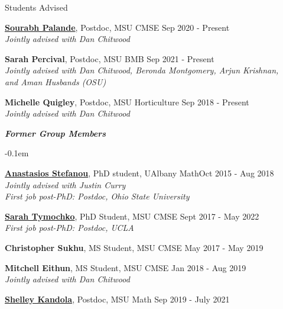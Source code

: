 \documentclass{resume} %
\begin{document}
\begin{rSection}{Students Advised}
\begin{list}{}{\leftmargin=1em}
   \item \textbf{\href{http://sci.utah.edu/~sourabh/}{Sourabh Palande}}, Postdoc, MSU CMSE \hfill Sep 2020 - Present\\
   \phantom{XXX} \textit{Jointly advised with Dan Chitwood}

   \item \textbf{Sarah Percival}, Postdoc, MSU BMB \hfill Sep 2021 - Present\\
   \phantom{XXX} \textit{Jointly advised with Dan Chitwood, Beronda Montgomery, Arjun Krishnan,}\\
   \phantom{XXX} \textit{and Aman Husbands (OSU)}

   \item \textbf{Michelle Quigley}, Postdoc, MSU Horticulture \hfill Sep 2018 - Present\\
   \phantom{XXX} \textit{Jointly advised with Dan Chitwood}

\end{list}

\textbf{\textit{Former Group Members}}
\begin{list}{}{\leftmargin=1em}
   \itemsep -0.1em %


   \item \textbf{\href{https://sites.google.com/view/anastasiostefanou/home}{Anastasios Stefanou}}, PhD student, UAlbany Math\hfill Oct 2015 - Aug 2018
\\
   \phantom{XXX} \textit{Jointly advised with Justin Curry}
\\
   \phantom{XXX} \textit{First job post-PhD: Postdoc, Ohio State University}


   \item \textbf{\href{https://www.sarahtymochko.com/}{Sarah Tymochko}}, PhD Student, MSU CMSE \hfill Sept 2017 - May 2022
\\
   \phantom{XXX} \textit{First job post-PhD: Postdoc, UCLA}


   \item \textbf{Christopher Sukhu}, MS Student, MSU CMSE \hfill May 2017 - May 2019

   \item \textbf{Mitchell Eithun}, MS Student, MSU CMSE \hfill Jan 2018 - Aug 2019
\\
   \phantom{XXX} \textit{Jointly advised with Dan Chitwood}




   \item \textbf{\href{www.shelleykandola.com}{Shelley Kandola}}, Postdoc, MSU Math \hfill Sep 2019 - July 2021


\end{list}
\end{rSection}
\end{document}
